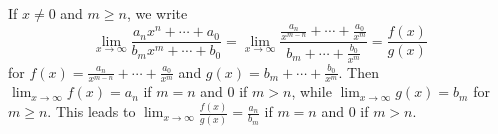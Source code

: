 \documentclass{article}
\begin{document}
If $x \neq 0$ and $m \geq n$, we write \begin{equation*}
  \lim_{x \rightarrow \infty}\frac{a_nx^n + \cdots + a_0}{b_mx^m + \cdots + b_0
    } = \lim_{x \rightarrow \infty}\frac{\frac{a_n}{x^{m - n}} + \cdots +
    \frac{a_0}{x^m}}{b_m + \cdots + \frac{b_0}{x^m}} = \frac{f(x)}{g(x)}
\end{equation*} for $f(x) = \frac{a_n}{x^{m - n}} + \cdots + \frac{a_0}{x^m}$
and $g(x) = b_m + \cdots + \frac{b_0}{x^m}$. Then $\lim_{x \rightarrow \infty}
f(x) = a_n$ if $m = n$ and 0 if $m > n$, while $\lim_{x \rightarrow \infty}g(x)
= b_m$ for $m \geq n$. This leads to $\lim_{x \rightarrow \infty}\frac{f(x)}{
g(x)} = \frac{a_n}{b_m}$ if $m = n$ and 0 if $m > n$.
\end{document}
